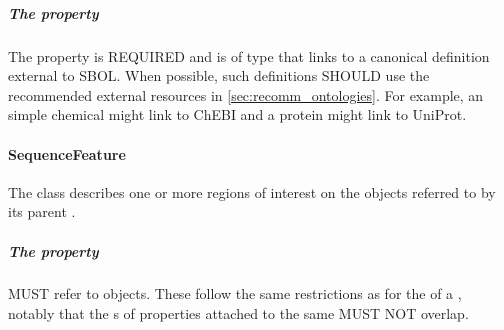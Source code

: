 \subparagraph{The  property}\label{sec:definition:ED}

The  property is REQUIRED and is of type  that links to a canonical definition external to SBOL.
When possible, such definitions SHOULD use the recommended external resources in \ref{sec:recomm_ontologies}.
For example, an  simple chemical might link to ChEBI and a protein might link to UniProt.

\paragraph{SequenceFeature}
\label{sec:SequenceFeature}

The  class describes one or more regions of interest on the  objects referred to by its parent . 

\subparagraph{The  property}\label{sec:hasLocation:SF}

 MUST refer to  objects. 
These follow the same restrictions as for the  of a , notably that the s of  properties attached to the same  MUST NOT overlap.

